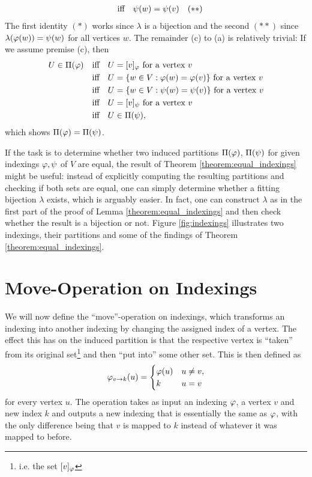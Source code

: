 \begin{\appendixproof}
\begin{align*}
        &\quad\text{iff}\quad \psi(w) = \psi(v) &(**)
    \end{align*}
    The first identity $(*)$ works since $\lambda$ is a bijection and the second $(**)$ since $\lambda(\varphi(w))=\psi(w)$ for all vertices $w$.
    The remainder (c) to (a) is relatively trivial: If we assume premise (c), then
    \begin{align*}
        U \in \Pi(\varphi) &\quad\text{iff}\quad U = [v]_\varphi \text{ for a vertex $v$} \\
        &\quad\text{iff}\quad U = \{ w \in V : \varphi(w) = \varphi(v) \} \text{ for a vertex $v$} \\
        &\quad\text{iff}\quad U = \{ w \in V : \psi(w) = \psi(v) \} \text{ for a vertex $v$} \\ 
        &\quad\text{iff}\quad U = [v]_{\psi} \text{ for a vertex $v$} \\
        &\quad\text{iff}\quad U \in \Pi(\psi),
    \end{align*}
    which shows $\Pi(\varphi)=\Pi(\psi)$.
\end{\appendixproof}

If the task is to determine whether two induced partitions $\Pi(\varphi)$, $\Pi(\psi)$ for given indexings $\varphi,\psi$ of $V$ are equal, the result of Theorem \ref{theorem:equal_indexings} might be useful: instead of explicitly computing the resulting partitions and checking if both sets are equal, one can simply determine whether a fitting bijection $\lambda$ exists, which is arguably easier. In fact, one can construct $\lambda$ as in the first part of the proof of Lemma \ref{theorem:equal_indexings} and then check whether the result is a bijection or not. Figure \ref{fig:indexings} illustrates two indexings, their partitions and some of the findings of Theorem \ref{theorem:equal_indexings}.


\section{Move-Operation on Indexings}

We will now define the ``move''-operation on indexings, which transforms an indexing into another indexing by changing the assigned index of a vertex. The effect this has on the induced partition is that the respective vertex is ``taken'' from its original set\footnote{i.e. the set $[v]_\varphi$} and then ``put into'' some other set. This is then defined as
\begin{equation} 
\varphi_{ v\rightarrow  k}(u) = \begin{cases}
    \varphi(u) & u \neq v, \\ 
    k & u = v
\end{cases} \label{eq:move-operation}
\end{equation} 
for every vertex $u$. The operation takes as input an indexing $\varphi$, a vertex $v$ and new index $k$ and outputs a new indexing that is essentially the same as $\varphi$, with the only difference being that $v$ is mapped to $k$ instead of whatever it was mapped to before.

